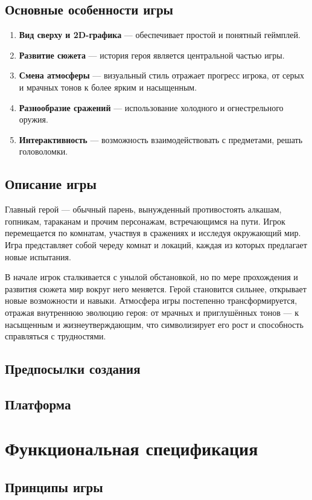 \documentclass{article}
\begin{document}
    \subsection{Основные особенности игры}
    \begin{enumerate}
    \item \textbf{Вид сверху и 2D-графика} — обеспечивает простой и понятный геймплей.
    \item \textbf{Развитие сюжета} — история героя является центральной частью игры.
    \item \textbf{Смена атмосферы} — визуальный стиль отражает прогресс игрока, от серых и мрачных тонов к более ярким и насыщенным.
    \item \textbf{Разнообразие сражений} — использование холодного и огнестрельного оружия.
    \item \textbf{Интерактивность} — возможность взаимодействовать с предметами, решать головоломки.
\end{enumerate}
    \subsection{Описание игры}
    Главный герой — обычный парень, вынужденный противостоять алкашам, гопникам, тараканам и прочим персонажам, встречающимся на пути. Игрок перемещается по комнатам, участвуя в сражениях и исследуя окружающий мир. Игра представляет собой череду комнат и локаций, каждая из которых предлагает новые испытания.

    В начале игрок сталкивается с унылой обстановкой, но по мере прохождения и развития сюжета мир вокруг него меняется. Герой становится сильнее, открывает новые возможности и навыки. Атмосфера игры постепенно трансформируется, отражая внутреннюю эволюцию героя: от мрачных и приглушённых тонов — к насыщенным и жизнеутверждающим, что символизирует его рост и способность справляться с трудностями.
    \subsection{Предпосылки создания}
    \subsection{Платформа}

\section{Функциональная спецификация}
    \subsection{Принципы игры}
\end{document}

